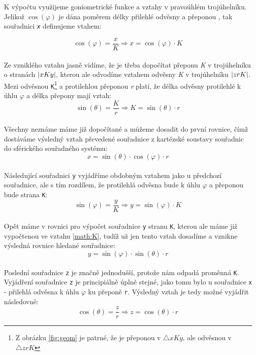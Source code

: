 \newpage

K výpočtu využijeme goniometrické funkce  a vztahy v pravoúhlém trojúhelníku. Jelikož $ \cos (\varphi) $ je dána poměrem délky přilehlé odvěsny a přeponou \cite{Goniometrie}, tak souřadnici \texttt{\textit{x}} definujeme vtahem:
 
\begin{equation}
 \cos (\varphi) = \frac{x}{K}  \Rightarrow x = \cos (\varphi) \cdot K
\end{equation}
\\
Ze vzniklého vztahu jasně vidíme, že je třeba dopočítat přeponu \textit{K} v trojúhelníku  o stranách $\arrowvert xKy\arrowvert$, kterou ale odvodíme vztahem odvěsny \textit{K} v trojúhelníku $\arrowvert zrK\arrowvert$. Mezi odvěsnou \texttt{K}\footnote{Z obrázku \ref{fig:geom} je patrné, že je přeponou v $\bigtriangleup xKy$, ale odvěsnou v $\bigtriangleup zrK$} a protilehlou přeponou \textit{r} platí, že délka odvěsny protilehlé k úhlu $\varphi$ a délka přepony \cite{Goniometrie} mají vztah:
\\
\begin{equation}
\label{math:K}
\sin (\theta) = \frac{K}{r}  \Rightarrow K = \sin (\theta) \cdot r
\end{equation}
\\
Všechny neznáme máme již dopočítané a můžeme dosadit do první rovnice, čímž dostáváme výsledný vztah převedené souřadnice z kartézské soustavy souřadnic do sférického souřadného systému:
\\
\begin{equation}
\label{math:x}
x = \sin (\theta) \cdot  \cos (\varphi) \cdot r
\end{equation}
\\
Následující souřadnici \texttt{y} vyjádříme obdobným vztahem jako u předchozí souřadnice, ale s tím rozdílem, že protilehlá odvěsna bude k úhlu $\varphi$ a přeponou bude strana \texttt{K}:
\\
\begin{displaymath}
\sin (\varphi) = \frac{y}{K}  \Rightarrow y = \sin (\varphi) \cdot K
\end{displaymath}
\\
Opět máme v rovnici pro výpočet souřadnice \texttt{y} stranu \texttt{K}, kterou ale máme již vypočtenou ve vztahu \ref{math:K}, tudíž už jen tento vztah dosadíme a vznikne výsledná rovnice hledané  souřadnice:
\\
\begin{equation}
\label{math:y}
y = \sin (\varphi) \cdot \sin (\theta) \cdot r
\end{equation}
\\
Poslední souřadnice \texttt{z} je značně jednodušší, protože nám odpadá proměnná \texttt{K}. Vyjádření souřadnice \texttt{z} je principiálně úplně stejné, jako tomu bylo u souřadnice \texttt{x} - přilehlá odvěsna k úhlu $\varphi$ ku přeponě \texttt{r}. Výsledný vztah je tedy možné vyjádřit následovně:
\\
\begin{equation}
\label{math:z}
\cos (\theta) = \frac{z}{r} \Rightarrow z = \cos (\theta) \cdot r
\end{equation}

